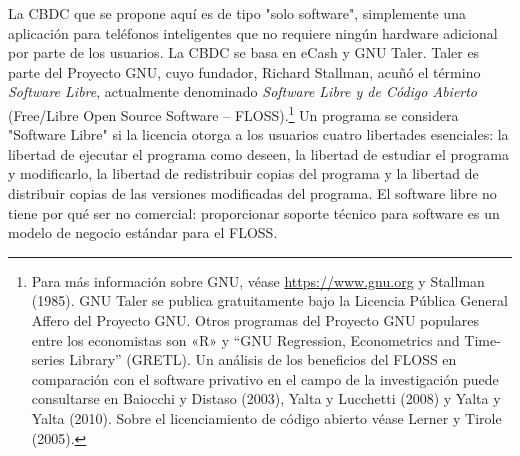 \documentclass[10pt,spanish]{article}
\begin{document}
La CBDC que se propone aquí es de tipo "solo software", simplemente una
aplicación para teléfonos inteligentes que no requiere ningún hardware
adicional por parte de los usuarios. La CBDC se basa en eCash y GNU
Taler. Taler es parte del Proyecto GNU, cuyo fundador, Richard Stallman,
acuñó el término \emph{Software Libre}, actualmente denominado \emph{Software
Libre y de Código Abierto} (Free/Libre Open Source Software --
FLOSS).\footnote{Para más información sobre GNU, véase
\url{https://www.gnu.org} y Stallman (1985). GNU Taler se publica
gratuitamente bajo la Licencia Pública General Affero del Proyecto
GNU. Otros programas del Proyecto GNU populares entre los economistas
son «R» y ``GNU Regression, Econometrics and Time-series Library''
(GRETL). Un análisis de los beneficios del FLOSS en comparación con el
software privativo en el campo de la investigación puede consultarse
en Baiocchi y Distaso (2003), Yalta y Lucchetti (2008) y Yalta y Yalta
(2010). Sobre el licenciamiento de código abierto véase Lerner y
Tirole (2005).} Un programa se considera "Software Libre" si la licencia
otorga a los usuarios cuatro libertades esenciales: la libertad
de ejecutar el programa como deseen, la libertad de estudiar el programa
y modificarlo, la libertad de redistribuir copias del programa y la
libertad de distribuir copias de las versiones modificadas del programa.
El software libre no tiene por qué ser no comercial: proporcionar
soporte técnico para software es un modelo de negocio estándar para el
FLOSS.
\end{document}
